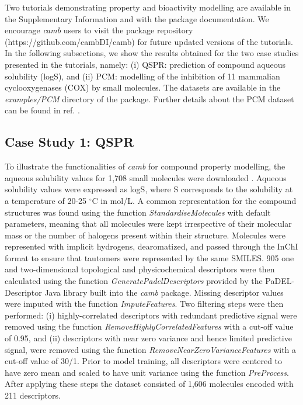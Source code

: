 \documentclass{bmcart}
\begin{document}
Two tutorials demonstrating property and bioactivity modelling are available in the Supplementary Information
and with the package documentation.
We encourage {\it camb} users to visit the package repository (https://github.com/cambDI/camb)
for future updated versions of the tutorials.
In the following subsections, we show the results obtained for the two case studies 
presented in the tutorials, namely:
(i) QSPR: prediction of compound aqueous solubility (logS),
and (ii) PCM:
modelling of the inhibition of 11 mammalian cyclooxygenases (COX) by small molecules.
The datasets are available in the {\it examples/PCM} directory of the package.
Further details about the PCM dataset can be found in ref. \cite{cortesCOX}.

\subsection*{Case Study 1: QSPR}

To illustrate the functionalities of {\it camb} for compound property modelling, the aqueous solubility values for 1,708 small molecules were downloaded \cite{LogS}.
Aqueous solubility values were expressed as logS, where S corresponds to the solubility at a temperature of 20-25 $^{\circ}$C in mol/L.
A common representation for the compound structures was found using the function 
{\it StandardiseMolecules} with default parameters, meaning that all molecules were kept irrespective of their molecular mass or the number of halogens present within their structure.
Molecules were represented with implicit hydrogens, dearomatized, 
and passed through the InChI format to ensure that tautomers were represented by the same SMILES. 
905 one and two-dimensional topological and physicochemical descriptors were then calculated using the function {\it GeneratePadelDescriptors}
provided by the PaDEL-Descriptor \cite{padel} Java library built into the {\it camb} package.
Missing descriptor values were imputed with the function {\it ImputeFeatures}.
Two filtering steps were then performed: (i) highly-correlated descriptors with redundant predictive signal were removed using the function 
{\it RemoveHighlyCorrelatedFeatures} with a cut-off value of 0.95, and (ii) descriptors with near zero variance
and hence limited predictive signal, were removed using the function {\it RemoveNearZeroVarianceFeatures} with a cut-off value of 30/1.
Prior to model training, all descriptors were centered to have zero mean and scaled to have unit variance using the function {\it PreProcess}.
After applying these steps the dataset consisted of 1,606 molecules encoded with 211 descriptors.
\end{document}
